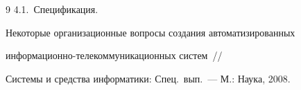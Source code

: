 {{\begin{thebibliography}{9}
4.1.~Спецификация.





\label{end\stat}









Некоторые организационные вопросы создания автоматизированных 


ин\-фор\-ма\-ци\-он\-но-те\-ле\-ком\-му\-ни\-ка\-ци\-он\-ных сис\-тем~/\!\!/ 


Системы и средства информатики: Спец.\ вып.~--- М.: Наука, 2008.


 \end{thebibliography}


}


}


